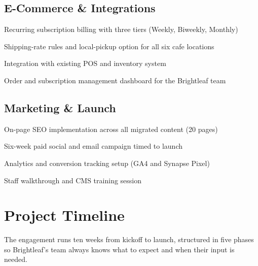 \documentclass[11pt]{article}
\begin{document}
\subsection{E-Commerce \& Integrations}
\begin{checklist}
  \item Recurring subscription billing with three tiers (Weekly, Biweekly, Monthly)
  \item Shipping-rate rules and local-pickup option for all six cafe locations
  \item Integration with existing POS and inventory system
  \item Order and subscription management dashboard for the Brightleaf team
\end{checklist}

\subsection{Marketing \& Launch}
\begin{checklist}
  \item On-page SEO implementation across all migrated content (20 pages)
  \item Six-week paid social and email campaign timed to launch
  \item Analytics and conversion tracking setup (GA4 and Synapse Pixel)
  \item Staff walkthrough and CMS training session
\end{checklist}

\clearpage

\section{Project Timeline}

The engagement runs ten weeks from kickoff to launch, structured in five phases so Brightleaf's
team always knows what to expect and when their input is needed.
\end{document}
